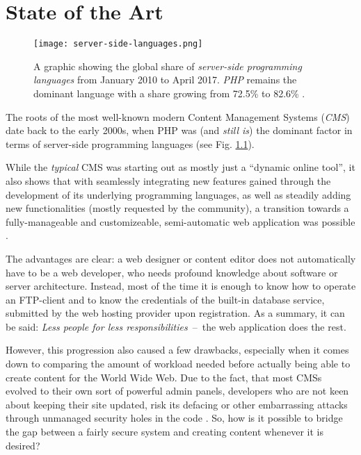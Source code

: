 \chapter{State of the Art}
\label{cha:state-of-the-art}

\begin{figure}
    \centering
    \texttt{[image: server-side-languages.png]}
    \caption{A graphic showing the global share of \emph{server-side programming languages} from January 2010 to April 2017. \emph{PHP} remains the dominant language with a share growing from 72.5\% to 82.6\% \cite{W3TechLanguageTrends}.}
    \label{fig:server-side-languages}
\end{figure}
%

The roots of the most well-known modern Content Management Systems (\emph{CMS}) date back to the early 2000s, when PHP was (and \emph{still is}) the dominant factor in terms of server-side programming languages (see Fig. \ref{fig:server-side-languages}). %

While the \emph{typical} CMS was starting out as mostly just a ``dynamic online tool'', it also shows that with seamlessly integrating new features gained through the development of its underlying programming languages, as well as steadily adding new functionalities (mostly requested by the community), a transition towards a fully-manageable and customizeable, semi-automatic web application was possible \cite[17]{dhillon2016}.

The advantages are clear: a web designer or content editor does not automatically have to be a web developer, who needs profound knowledge about software or server architecture. Instead, most of the time it is enough to know how to operate an FTP-client and to know the credentials of the built-in database service, submitted by the web hosting provider upon registration. As a summary, it can be said: \emph{Less people for less responsibilities}~--~the web application does the rest.

However, this progression also caused a few drawbacks, especially when it comes down to comparing the amount of workload needed before actually being able to create content for the World Wide Web. Due to the fact, that most CMSs evolved to their own sort of powerful admin panels, developers who are not keen about keeping their site updated, risk its defacing or other embarrassing attacks through unmanaged security holes in the code \cite[23]{dhillon2016}. So, how is it possible to bridge the gap between a fairly secure system and creating content whenever it is desired?

